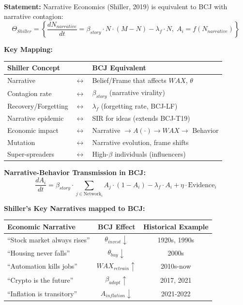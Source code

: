 \begin{tcolorbox}[colback=green!5!white, colframe=green!75!black,
    title=Theorem BCJ-T24: Shiller Narrative Economics as Special Case]
\textbf{Statement:} Narrative Economics (Shiller, 2019) is equivalent to BCJ with narrative contagion:
\begin{equation}
\Theta_{Shiller} = \left\{\frac{dN_{narrative}}{dt} = \beta_{story} \cdot N \cdot (M-N) - \lambda_f \cdot N, \; A_i = f(N_{narrative})\right\}
\end{equation}

\textbf{Key Mapping:}
\begin{center}
\begin{tabular}{lcl}
\toprule
\textbf{Shiller Concept} & & \textbf{BCJ Equivalent} \\
\midrule
Narrative & $\leftrightarrow$ & Belief/Frame that affects $WAX$, $\theta$ \\
Contagion rate & $\leftrightarrow$ & $\beta_{story}$ (narrative virality) \\
Recovery/Forgetting & $\leftrightarrow$ & $\lambda_f$ (forgetting rate, BCJ-LF) \\
Narrative epidemic & $\leftrightarrow$ & SIR for ideas (extends BCJ-T19) \\
Economic impact & $\leftrightarrow$ & Narrative $\to A(\cdot) \to WAX \to$ Behavior \\
Mutation & $\leftrightarrow$ & Narrative evolution, frame shifts \\
Super-spreaders & $\leftrightarrow$ & High-$\beta$ individuals (influencers) \\
\bottomrule
\end{tabular}
\end{center}

\textbf{Narrative-Behavior Transmission in BCJ:}
\begin{equation}
\frac{dA_i}{dt} = \beta_{story} \cdot \sum_{j \in \text{Network}_i} A_j \cdot (1 - A_i) - \lambda_f \cdot A_i + \eta \cdot \text{Evidence}_i
\end{equation}

\textbf{Shiller's Key Narratives mapped to BCJ:}
\begin{center}
\begin{tabular}{lcc}
\toprule
\textbf{Economic Narrative} & \textbf{BCJ Effect} & \textbf{Historical Example} \\
\midrule
``Stock market always rises'' & $\theta_{invest} \downarrow$ & 1920s, 1990s \\
``Housing never falls'' & $\theta_{buy} \downarrow$ & 2000s \\
``Automation kills jobs'' & $WAX_{retrain} \uparrow$ & 2010s-now \\
``Crypto is the future'' & $\beta_{adopt} \uparrow$ & 2017, 2021 \\
``Inflation is transitory'' & $A_{inflation} \downarrow$ & 2021-2022 \\
\bottomrule
\end{tabular}
\end{center}


\end{tcolorbox}
